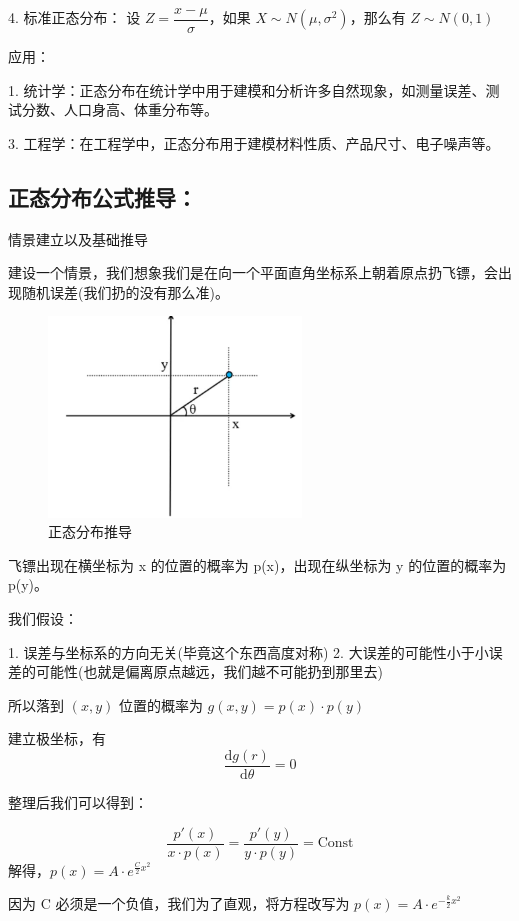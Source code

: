 \documentclass[12pt, a4paper, oneside]{ctexbook}
\begin{document}
4. 标准正态分布：
   设 $Z = \dfrac{x - \mu}{\sigma}$，如果 $X \sim N(\mu, \sigma^{2})$，那么有 $Z \sim N(0, 1)$

 应用：

1. 统计学：正态分布在统计学中用于建模和分析许多自然现象，如测量误差、测试分数、人口身高、体重分布等。

3. 工程学：在工程学中，正态分布用于建模材料性质、产品尺寸、电子噪声等。

\subsection{ 正态分布公式推导：}

 情景建立以及基础推导

建设一个情景，我们想象我们是在向一个平面直角坐标系上朝着原点扔飞镖，会出现随机误差(我们扔的没有那么准)。

\begin{figure}[H]
  \centering
  \includegraphics[width=0.6\textwidth]{image/正态分布推导.png}
  \caption{正态分布推导}
  \label{fig:example}
\end{figure}

飞镖出现在横坐标为 x 的位置的概率为 p(x)，出现在纵坐标为 y 的位置的概率为 p(y)。

我们假设：

1. 误差与坐标系的方向无关(毕竟这个东西高度对称)
2. 大误差的可能性小于小误差的可能性(也就是偏离原点越远，我们越不可能扔到那里去)

所以落到 $(x,y)$ 位置的概率为 $g(x, y) = p(x) \cdot p(y)$

建立极坐标，有
$$
\dfrac{\mathrm{d}g(r)}{\mathrm{d}\theta} = 0
$$

整理后我们可以得到：

$$
\dfrac{p'(x)}{x \cdot p(x)} = \dfrac{p'(y)}{y \cdot p(y)} = \text{Const}
$$
解得，$p(x) = A \cdot e^{\frac{C}{2}x^{2}}$

因为 C 必须是一个负值，我们为了直观，将方程改写为 $p(x) = A\cdot e^{-\frac{k}{2}x^{2}}$
\end{document}
